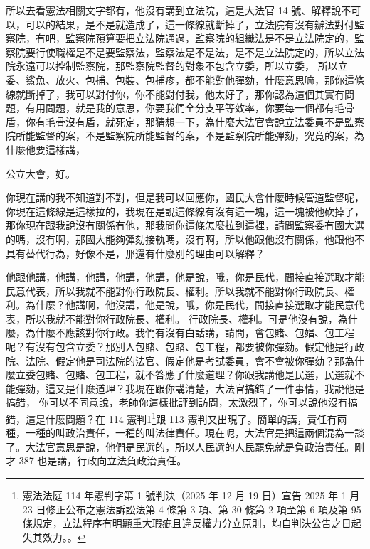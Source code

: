 \hypertarget{c08:cue:131}{}所以去看憲法相關文字都有，他沒有講到立法院，這是大法官 14 號、解釋說不可以，可以的結果，是不是就造成了，這一條線就斷掉了，立法院有沒有辦法對付監察院，有吧，監察院預算要把立法院通過，監察院的組織法是不是立法院定的，監察院要行使職權是不是要監察法，監察法是不是法，是不是立法院定的，所以立法院永遠可以控制監察院，那監察院監督的對象不包含立委，所以立委，
\hypertarget{c08:cue:132}{}所以立委、鯊魚、放火、包捕、包裝、包捕疹，都不能對他彈劾，什麼意思嘛，那你這條線就斷掉了，我可以對付你，你不能對付我，他太好了，那你認為這個其實有問題，有用問題，就是我的意思，你要我們全分支平等效率，你要每一個都有毛骨盾，你有毛骨沒有盾，就死定，那猜想一下，為什麼大法官會說立法委員不是監察院所能監督的案，不是監察院所能監督的案，不是監察院所能彈劾，究竟的案，為什麼他要這樣講，\par{}公立大會，好。

\hypertarget{c08:cue:133}{}你現在講的我不知道對不對，但是我可以回應你，國民大會什麼時候管道監督呢，你現在這條線是這樣拉的，我現在是說這條線有沒有這一塊，這一塊被他砍掉了，那你現在跟我說沒有關係有他，那我問你這條怎麼拉到這裡，請問監察委有國大選的嗎，沒有啊，那國大能夠彈劾接軌嗎，沒有啊，所以他跟他沒有關係，他跟他不具有替代行為，好像不是，那還有什麼別的理由可以解釋？

\hypertarget{c08:cue:134}{}他跟他講，他講，他講，他講，他講，他是說，哦，你是民代，間接直接選取才能民意代表，所以我就不能對你行政院長、權利。所以我就不能對你行政院長、權利。為什麼？他講啊，他沒講，他是說，哦，你是民代，間接直接選取才能民意代表，所以我就不能對你行政院長、權利。
\hypertarget{c08:cue:135}{}行政院長、權利。可是他沒有說，為什麼，為什麼不應該對你行政。我們有沒有白話講，請問，會包賭、包娼、包工程呢？有沒有包含立委？那別人包賭、包賭、包工程，都要被你彈劾。假定他是行政院、法院、假定他是司法院的法官、假定他是考試委員，會不會被你彈劾？那為什麼立委包賭、包賭、包工程，就不答應了什麼道理？你跟我講他是民選，民選就不能彈劾，這又是什麼道理？我現在跟你講清楚，大法官搞錯了一件事情，我說他是搞錯，
\hypertarget{c08:cue:136}{}你可以不同意說，老師你這樣批評到訪問，太激烈了，你可以說他沒有搞錯，這是什麼問題？在 114 憲判1\footnote{憲法法庭 114 年憲判字第 1 號判決（2025 年 12 月 19 日）宣告 2025 年 1 月 23 日修正公布之憲法訴訟法第 4 條第 3 項、第 30 條第 2 項至第 6 項及第 95 條規定，立法程序有明顯重大瑕疵且違反權力分立原則，均自判決公告之日起失其效力。\cite{ccj114-1}。}跟 113 憲判又出現了。簡單的講，責任有兩種，一種的叫政治責任，一種的叫法律責任。現在呢，大法官是把這兩個混為一談了。大法官意思是說，他們是民選的，所以人民選的人民罷免就是負政治責任。剛才 387 也是講，行政向立法負政治責任。

